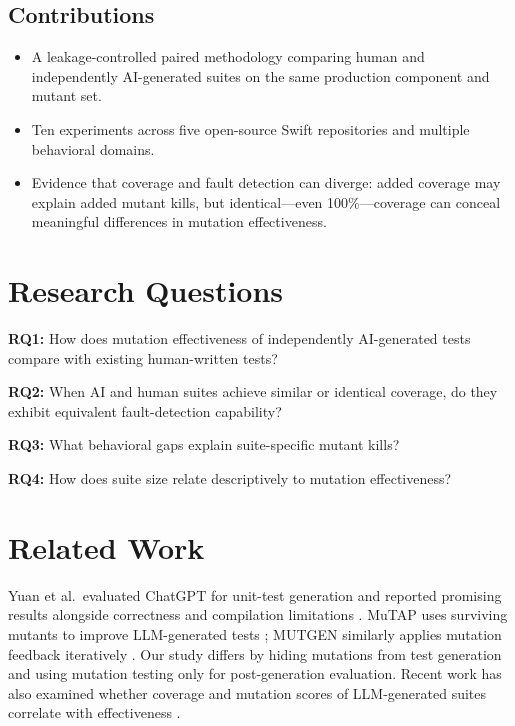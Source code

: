 \documentclass[10pt,conference]{IEEEtran}
\begin{document}
\subsection{Contributions}
\begin{itemize}
\item A leakage-controlled paired methodology comparing human and independently AI-generated suites on the same production component and mutant set.
\item Ten experiments across five open-source Swift repositories and multiple behavioral domains.
\item Evidence that coverage and fault detection can diverge: added coverage may explain added mutant kills, but identical---even 100\%---coverage can conceal meaningful differences in mutation effectiveness.
\end{itemize}

\section{Research Questions}
\textbf{RQ1:} How does mutation effectiveness of independently AI-generated tests compare with existing human-written tests?

\textbf{RQ2:} When AI and human suites achieve similar or identical coverage, do they exhibit equivalent fault-detection capability?

\textbf{RQ3:} What behavioral gaps explain suite-specific mutant kills?

\textbf{RQ4:} How does suite size relate descriptively to mutation effectiveness?

\section{Related Work}
Yuan et al.\ evaluated ChatGPT for unit-test generation and reported promising results alongside correctness and compilation limitations \cite{yuan2023}. MuTAP uses surviving mutants to improve LLM-generated tests \cite{mutap2024}; MUTGEN similarly applies mutation feedback iteratively \cite{mutgen2026}. Our study differs by hiding mutations from test generation and using mutation testing only for post-generation evaluation. Recent work has also examined whether coverage and mutation scores of LLM-generated suites correlate with effectiveness \cite{zhao2026}.
\end{document}
